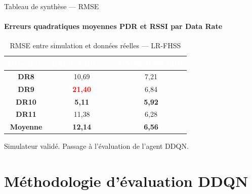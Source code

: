 \documentclass[aspectratio=169, 11pt]{beamer}
\begin{document}
	
	\begin{frame}{Tableau de synthèse — RMSE }
		\framesubtitle{Erreurs quadratiques moyennes PDR et RSSI par Data Rate}
		
		
		\begin{table}
			\centering
			\renewcommand{\arraystretch}{1.35}
			\begin{tabular}{|>{\bfseries}c|c|c|}
				\hline
				\rowcolor{blue!50}
				\textcolor{white}{\textbf{Data Rate}} &
				\textcolor{white}{\textbf{RMSE PDR (\%)}} &
				\textcolor{white}{\textbf{RMSE RSSI (dB)}} \\
				\hline
				DR8  & 10{,}69 & 7{,}21 \\
				\hline
				\rowcolor{gray!20}
				DR9  & \textcolor{red}{\textbf{21{,}40}} & 6{,}84 \\
				\hline
				DR10 & \textcolor{green!50!black}{\textbf{5{,}11}} & \textcolor{green!50!black}{\textbf{5{,}92}} \\
				\hline
				\rowcolor{gray!20}
				DR11 & 11{,}38 & 6{,}28 \\
				\hline\hline
				\rowcolor{cyan!30}
				\textbf{Moyenne} & \textbf{12{,}14} & \textbf{6{,}56} \\
				\hline
			\end{tabular}
			\caption{RMSE entre simulation et données réelles — LR-FHSS}
			\label{tab:validation_errors}
		\end{table}
		
		\vspace{0.2em}
		\begin{tcolorbox}[
			colback=green!10, colframe=green!50!black, boxrule=0.8pt,
			left=6pt, right=6pt, top=3pt, bottom=3pt, sharp corners
			]
			\centering\small\textcolor{green!50!black}{%
				Simulateur validé. Passage à l'évaluation de l'agent DDQN.}
		\end{tcolorbox}
	\end{frame}
	
	\section{Méthodologie d'évaluation DDQN}
	
\end{document}
